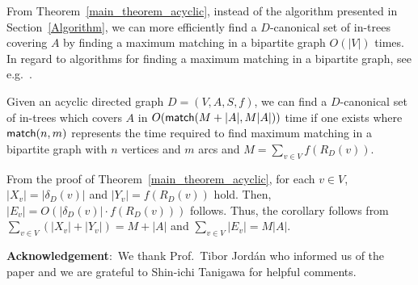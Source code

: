 \documentclass[11pt]{article}
\newcounter{ichi}
\newcounter{ni}
\theoremstyle{plain}
\newcommand{\eop}{\hfill \usebox{\ProofSym}}
\newenvironment{proof}{\noindent {\it Proof.}}{\eop\par\vspace{0.3cm}}
\begin{document}
From Theorem~\ref{main_theorem_acyclic}, 
instead of the algorithm presented in Section~\ref{Algorithm}, 
we can more efficiently find a $D$-canonical set
of in-trees covering $A$ by finding a maximum matching in
a bipartite graph $O(|V|)$ times.  
In regard to algorithms for finding a maximum matching in a bipartite
graph, see e.g.~\cite{HK73}. 

\begin{corollary} 
Given an acyclic directed graph  $D=(V,A,S,f)$, 
we can find a $D$-canonical set of in-trees which covers $A$
in $O({\sf match}(M+|A|, M|A|))$ time if one exists 
where ${\sf match}(n,m)$ represents the time 
required to find maximum matching in a bipartite graph with $n$ vertices and 
$m$ arcs and $M=\sum_{v \in V}f(R_D(v))$. 
\end{corollary}
\begin{proof}
From the proof of Theorem~\ref{main_theorem_acyclic}, for each $v \in
V$, $|X_v|=|\delta_D(v)|$ and $|Y_v|=f(R_D(v))$ hold. Then,
 $|E_v|=O(|\delta_D(v)|\cdot f(R_D(v)))$ follows. 
Thus, the corollary follows from 
$\sum_{v \in V}(|X_v|+|Y_v|)=M+|A|$ and $\sum_{v \in V}|E_v|=M|A|$. 
\end{proof}
{\bf Acknowledgement$\colon$}
We thank Prof.~Tibor Jord\'{a}n who informed us of the paper \cite{F06} and 
we are grateful to Shin-ichi Tanigawa for helpful comments. 
\end{document}
